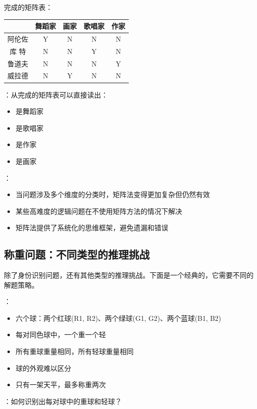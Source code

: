 完成的矩阵表：

\begin{center}
\begin{tabular}{|c|c|c|c|c|}
\hline
 & 舞蹈家 & 画家 & 歌唱家 & 作家 \\
\hline
阿伦佐 & Y & N & N & N \\
\hline
库 特 & N & N & Y & N \\
\hline
鲁道夫 & N & N & N & Y \\
\hline
威拉德 & N & Y & N & N \\
\hline
\end{tabular}
\end{center}

：从完成的矩阵表可以直接读出：
\begin{itemize}
  \item {}是舞蹈家
  \item {}是歌唱家
  \item {}是作家
  \item {}是画家
\end{itemize}

\begin{theorembox}[title=矩阵法的适用性]
：
\begin{itemize}
  \item 当问题涉及多个维度的分类时，矩阵法变得更加复杂但仍然有效
  \item 某些高难度的逻辑问题在不使用矩阵方法的情况下解决
  \item 矩阵法提供了系统化的思维框架，避免遗漏和错误
\end{itemize}
\end{theorembox}

\subsection{称重问题：不同类型的推理挑战}

除了身份识别问题，还有其他类型的推理挑战。下面是一个经典的，它需要不同的解题策略。

\begin{examplebox}[title=六球称重问题]
：
\begin{itemize}
  \item 六个球：两个红球(R1, R2)、两个绿球(G1, G2)、两个蓝球(B1, B2)
  \item 每对同色球中，一个重一个轻
  \item 所有重球重量相同，所有轻球重量相同
  \item 球的外观难以区分
  \item 只有一架天平，最多称重两次
\end{itemize}

：如何识别出每对球中的重球和轻球？
\end{examplebox}

